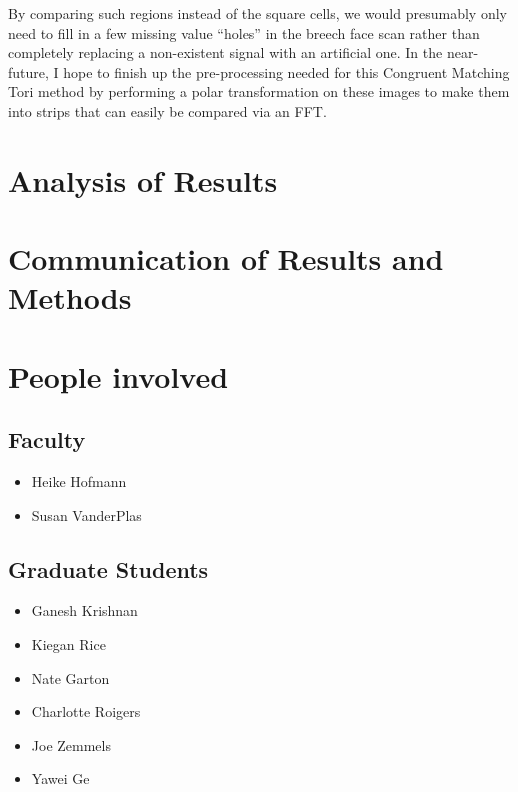 \documentclass[]{book}
\providecommand{\tightlist}{%
  \setlength{\itemsep}{0pt}\setlength{\parskip}{0pt}}
\begin{document}
By comparing such regions instead of the square cells, we would presumably only need to fill in a few missing value ``holes'' in the breech face scan rather than completely replacing a non-existent signal with an artificial one. In the near-future, I hope to finish up the pre-processing needed for this Congruent Matching Tori method by performing a polar transformation on these images to make them into strips that can easily be compared via an FFT.

\hypertarget{analysis-of-results}{%
\section{Analysis of Results}\label{analysis-of-results}}

\hypertarget{communication-of-results-and-methods}{%
\section{Communication of Results and Methods}\label{communication-of-results-and-methods}}

\hypertarget{people-involved}{%
\section{People involved}\label{people-involved}}

\hypertarget{faculty}{%
\subsection{Faculty}\label{faculty}}

\begin{itemize}
\tightlist
\item
  Heike Hofmann
\item
  Susan VanderPlas
\end{itemize}

\hypertarget{graduate-students}{%
\subsection{Graduate Students}\label{graduate-students}}

\begin{itemize}
\tightlist
\item
  Ganesh Krishnan
\item
  Kiegan Rice
\item
  Nate Garton
\item
  Charlotte Roigers
\item
  Joe Zemmels
\item
  Yawei Ge
\end{itemize}
\end{document}

